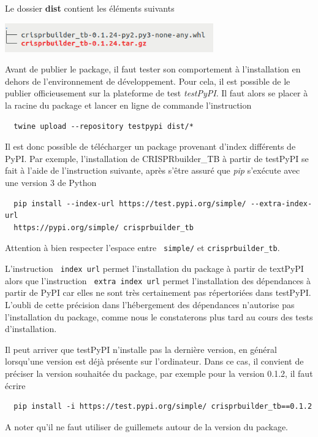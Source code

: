 \documentclass[twoside,a4paper,11pt,frenchb,openany]{report}
\begin{document}
Le dossier \textbf{dist} contient les éléments suivants

\includegraphics[width=9cm]{rep_dist.png}

Avant de publier le package, il faut tester son comportement à l'installation en dehors de l'environnement de développement. Pour cela, il est possible de le publier officieusement sur la plateforme de test \textit{testPyPI}. Il faut alors se placer à la racine du package et lancer en ligne de commande l'instruction
\begin{verbatim}  twine upload --repository testpypi dist/*\end{verbatim}

Il est donc possible de télécharger un package provenant d'index différents de PyPI. Par exemple, l'installation de CRISPRbuilder\_TB à partir de testPyPI se fait à l'aide de l'instruction suivante, après s'être assuré que \textit{pip} s'exécute avec une version 3 de Python

\begin{verbatim}  pip install --index-url https://test.pypi.org/simple/ --extra-index-url 
  https://pypi.org/simple/ crisprbuilder_tb\end{verbatim} 

Attention à bien respecter l'espace entre \texttt{ simple/} et \texttt{crisprbuilder\_tb}.

L'instruction \texttt{ \textemdash \textemdash index \textemdash url} permet l'installation du package à partir de textPyPI alors que l'instruction \texttt{ \textemdash \textemdash extra \textemdash index \textemdash url} permet l'installation des dépendances à partir de PyPI car elles ne sont très certainement pas répertoriées dans testPyPI. L'oubli de cette précision dans l'hébergement des dépendances n'autorise pas l'installation du package, comme nous le constaterons plus tard au cours des tests d'installation.

Il peut arriver que testPyPI n'installe pas la dernière version, en général lorsqu'une version est déjà présente sur l'ordinateur. Dans ce cas, il convient de préciser la version souhaitée du package, par exemple pour la version 0.1.2, il faut écrire

\begin{verbatim}  pip install -i https://test.pypi.org/simple/ crisprbuilder_tb==0.1.2\end{verbatim} A noter qu'il ne faut utiliser de guillemets autour de la version du package.
\end{document}
